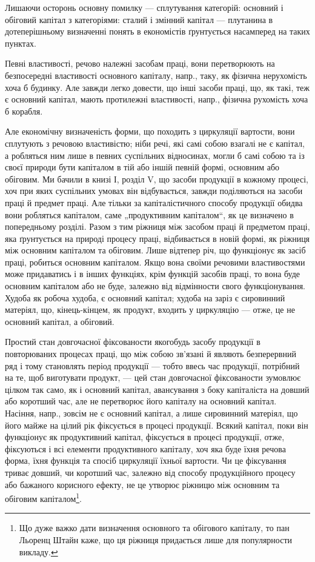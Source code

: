 Лишаючи осторонь основну помилку — сплутування категорій: основний
і обіговий капітал з категоріями: сталий і змінний капітал — плутанина
в дотеперішньому визначенні понять в економістів ґрунтується насамперед
на таких пунктах.

Певні властивості, речово належні засобам праці, вони перетворюють
на безпосередні властивості основного капіталу, напр., таку, як фізична
нерухомість хоча б будинку. Але завжди легко довести, що інші засоби
праці, що, як такі, теж є основний капітал, мають протилежні властивості,
напр., фізична рухомість хоча б корабля.

Але економічну визначеність форми, що походить з циркуляції вартости,
вони сплутують з речовою властивістю; ніби речі, які самі собою
взагалі не є капітал, а робляться ним лише в певних суспільних відносинах,
могли б самі собою та із своєї природи бути капіталом в
тій або іншій певній формі, основним або обіговим. Ми бачили в книзі
І, розділ V, що засоби продукції в кожному процесі, хоч при яких суспільних
умовах він відбувається, завжди поділяються на засоби праці й
предмет праці. Але тільки за капіталістичного способу продукції обидва
вони робляться капіталом, саме „продуктивним капіталом“, як це
визначено в попередньому розділі. Разом з тим ріжниця між засобом
праці й предметом праці, яка ґрунтується на природі процесу праці,
відбивається в новій формі, як ріжниця між основним капіталом та обіговим.
Лише відтепер річ, що функціонує як засіб праці, робиться основним
капіталом. Якщо вона своїми речовими властивостями може придаватись
і в інших функціях, крім функцій засобів праці, то вона буде
основним капіталом або не буде, залежно від відмінности свого функціонування.
Худоба як робоча худоба, є основний капітал; худоба на заріз
є сировинний матеріял, що, кінець-кінцем, як продукт, входить у
циркуляцію — отже, це не основний капітал, а обіговий.

Простий стан довгочасної фіксованости якогобудь засобу продукції
в повторюваних процесах праці, що між собою зв’язані й являють
безперервний ряд і тому становлять період продукції — тобто ввесь час
продукції, потрібний на те, щоб виготувати продукт, — цей стан довгочасної
фіксованости зумовлює цілком так само, як і основний капітал,
авансування з боку капіталіста на довший або коротший час, але не
перетворює його капіталу на основний капітал. Насіння, напр., зовсім не
є основний капітал, а лише сировинний матеріял, що його майже на
цілий рік фіксується в процесі продукції. Всякий капітал, поки він функціонує
як продуктивний капітал, фіксується в процесі продукції, отже,
фіксуються і всі елементи продуктивного капіталу, хоч яка буде їхня речова
форма, їхня функція та спосіб циркуляції їхньої вартости. Чи це фіксування
триває довший, чи коротший час, залежно від способу продукційного
процесу або бажаного корисного ефекту, не це утворює ріжницю між
основним та обіговим капіталом\footnote{
Що дуже важко дати визначення основного та обігового капіталу, то пан
Льоренц Штайн каже, що ця ріжниця придається лише для популярности викладу.
}.

